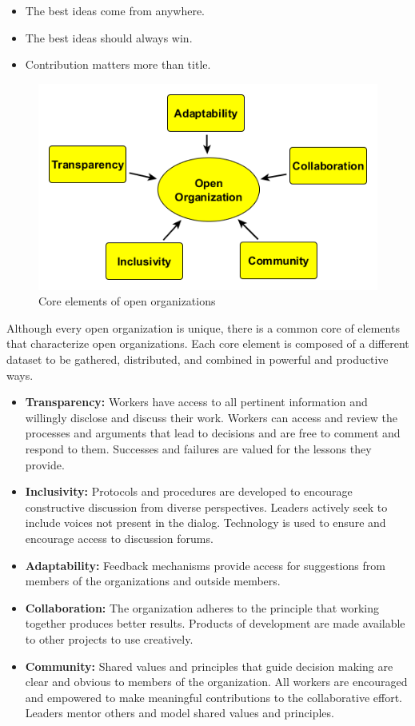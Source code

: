 \documentclass[]{book}
\providecommand{\tightlist}{%
  \setlength{\itemsep}{0pt}\setlength{\parskip}{0pt}}
\begin{document}
\begin{itemize}
\tightlist
\item
  The best ideas come from anywhere.
\item
  The best ideas should always win.
\item
  Contribution matters more than title.
\end{itemize}

\begin{figure}
\centering
\includegraphics{images/openorg.png}
\caption{Core elements of open organizations}
\end{figure}

Although every open organization is unique, there is a common core of elements that characterize open organizations. Each core element is composed of a different dataset to be gathered, distributed, and combined in powerful and productive ways.

\begin{itemize}
\tightlist
\item
  \textbf{Transparency:} Workers have access to all pertinent information and willingly disclose and discuss their work. Workers can access and review the processes and arguments that lead to decisions and are free to comment and respond to them. Successes and failures are valued for the lessons they provide.
\item
  \textbf{Inclusivity:} Protocols and procedures are developed to encourage constructive discussion from diverse perspectives. Leaders actively seek to include voices not present in the dialog. Technology is used to ensure and encourage access to discussion forums.
\item
  \textbf{Adaptability:} Feedback mechanisms provide access for suggestions from members of the organizations and outside members.
\item
  \textbf{Collaboration:} The organization adheres to the principle that working together produces better results. Products of development are made available to other projects to use creatively.
\item
  \textbf{Community:} Shared values and principles that guide decision making are clear and obvious to members of the organization. All workers are encouraged and empowered to make meaningful contributions to the collaborative effort. Leaders mentor others and model shared values and principles.
\end{itemize}
\end{document}
